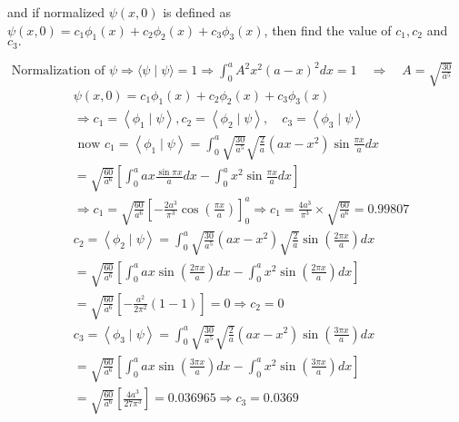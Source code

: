 \begin{enumerate}
\begin{minipage}{\textwidth}
$$	$$
	and if normalized $\psi(x, 0)$ is defined as $\psi(x, 0)=c_{1} \phi_{1}(x)+c_{2} \phi_{2}(x)+c_{3} \phi_{3}(x)$, then find the value of $c_{1}, c_{2}$ and $c_{3} .$
\end{minipage}
\begin{answer}
	$\text { Normalization of } \psi \Rightarrow\langle\psi \mid \psi\rangle=1 \Rightarrow \int_{0}^{a} A^{2} x^{2}(a-x)^{2} d x=1 \quad \Rightarrow \quad A=\sqrt{\frac{30}{a^{5}}}$\\
	\begin{align*}
		&\psi(x, 0)=c_{1} \phi_{1}(x)+c_{2} \phi_{2}(x)+c_{3} \phi_{3}(x) \\
		&\Rightarrow c_{1}=\left\langle\phi_{1} \mid \psi\right\rangle, c_{2}=\left\langle\phi_{2} \mid \psi\right\rangle, \quad c_{3}=\left\langle\phi_{3} \mid \psi\right\rangle\\
		&\text { now } c_{1}=\left\langle\phi_{1} \mid \psi\right\rangle=\int_{0}^{a} \sqrt{\frac{30}{a^{5}}} \sqrt{\frac{2}{a}}\left(a x-x^{2}\right) \sin \frac{\pi x}{a} d x \\
		&=\sqrt{\frac{60}{a^{6}}}\left[\int_{0}^{a} a x \frac{\sin \pi x}{a} d x-\int_{0}^{a} x^{2} \sin \frac{\pi x}{a} d x\right] \\
		&\Rightarrow c_{1}=\sqrt{\frac{60}{a^{6}}}\left[-\frac{2 a^{3}}{\pi^{3}} \cos \left(\frac{\pi x}{a}\right)\right]_{0}^{a} \Rightarrow c_{1}=\frac{4 a^{3}}{\pi^{3}} \times \sqrt{\frac{60}{a^{6}}}=0.99807\\
		&c_{2}=\left\langle\phi_{2} \mid \psi\right\rangle=\int_{0}^{a} \sqrt{\frac{30}{a^{5}}}\left(a x-x^{2}\right) \sqrt{\frac{2}{a}} \sin \left(\frac{2 \pi x}{a}\right) d x \\
		&=\sqrt{\frac{60}{a^{6}}}\left[\int_{0}^{a} a x \sin \left(\frac{2 \pi x}{a}\right) d x-\int_{0}^{a} x^{2} \sin \left(\frac{2 \pi x}{a}\right) d x\right] \\
		&=\sqrt{\frac{60}{a^{6}}}\left[-\frac{a^{2}}{2 \pi^{2}}(1-1)\right]=0 \Rightarrow c_{2}=0\\
		&c_{3}=\left\langle\phi_{3} \mid \psi\right\rangle=\int_{0}^{a} \sqrt{\frac{30}{a^{5}}} \sqrt{\frac{2}{a}}\left(a x-x^{2}\right) \sin \left(\frac{3 \pi x}{a}\right) d x \\
		&=\sqrt{\frac{60}{a^{6}}}\left[\int_{0}^{a} a x \sin \left(\frac{3 \pi x}{a}\right) d x-\int_{0}^{a} x^{2} \sin \left(\frac{3 \pi x}{a}\right) d x\right] \\
		&=\sqrt{\frac{60}{a^{6}}}\left[\frac{4 a^{3}}{27 \pi^{3}}\right]=0.036965 \Rightarrow c_{3}=0.0369
	\end{align*}

\end{answer}
\end{enumerate}
